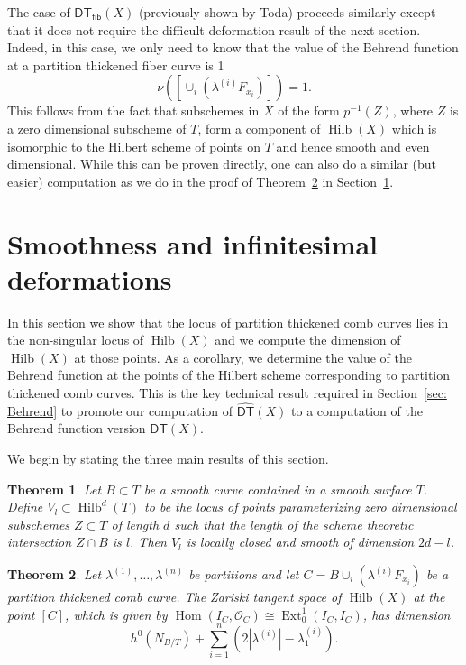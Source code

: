 \documentclass[12pt]{amsart}
\newtheorem{theorem}{Theorem}%
\theoremstyle{definition}
\renewcommand{\O}{\mathcal{O}}
\newcommand{\Hom}{\operatorname{Hom}}
\newcommand{\Ext}{\operatorname{Ext}}
\newcommand{\Hilb}{\operatorname{Hilb}}
\newcommand{\DT}{\mathsf{DT}}
\newcommand{\DThat}{\widehat{\DT}}
\newcommand{\fiber}{\mathsf{fib}}
\newcommand{\presectionspace}{\vspace{0.2cm}} %
\begin{document}
The case of $\DT_{\fiber}(X)$ (previously shown by Toda) proceeds
similarly except that it does not require the difficult deformation
result of the next section. Indeed, in this case, we only need to know
that the value of the Behrend function at a partition thickened fiber
curve is 1
\[
\nu \left(\left[ \cup_{i} \left(\lambda^{(i)}F_{x_{i}} \right) \right]
\right) =1.
\]
This follows from the fact that subschemes in $X$ of the form
$p^{-1}(Z)$, where $Z$ is a zero dimensional subscheme of $T$, form a
component of $\Hilb (X)$ which is isomorphic to the Hilbert scheme of
points on $T$ and hence smooth and even dimensional. While this can be
proven directly, one can also do a similar (but easier) computation as
we do in the proof of Theorem~\ref{thm: Ext computation} in
Section~\ref{sec: smoothness and deformations}.



\presectionspace
\section{Smoothness and infinitesimal deformations}\label{sec: smoothness and deformations}


In this section we show that the locus of partition thickened comb
curves lies in the non-singular locus of $\Hilb (X)$ and we compute
the dimension of $\Hilb (X)$ at those points. As a corollary, we
determine the value of the Behrend function at the points of the
Hilbert scheme corresponding to partition thickened comb curves. This
is the key technical result required in Section~\ref{sec: Behrend} to
promote our computation of $\DThat (X)$ to a computation of the
Behrend function version $\DT (X)$.


We begin by stating the three main results of this section.

\begin{theorem}\label{thm: strata of Hilb(C^2) with fixed intersection
is smooth} Let $B\subset T$ be a smooth curve contained in a smooth
surface $T$. Define $V_{l}\subset \Hilb^{d}(T)$ to be the locus of
points parameterizing zero dimensional subschemes $Z\subset T$ of length
$d$ such that the length of the scheme theoretic intersection $Z\cap
B$ is $l$. Then $V_{l}$ is locally closed and smooth of dimension
$2d-l$.
\end{theorem}

\begin{theorem}\label{thm: Ext computation}
Let $\lambda^{(1)},\dotsc ,\lambda^{(n)}$ be partitions and let
$C=B\cup_{i}\left(\lambda^{(i)}F_{x_{i}} \right)$ be a partition
thickened comb curve. The Zariski tangent space of $\Hilb (X)$ at
the point $[C]$, which is given by $\Hom (I_{C},\O_{C})\cong
\Ext^{1}_{0}(I_{C},I_{C})$, has dimension
\[
h^{0}(N_{B/T}) + \sum_{i=1}^{n}\left(2|\lambda^{(i)}| - \lambda_{1}^{(i)} \right).
\]
\end{theorem}
\end{document}
